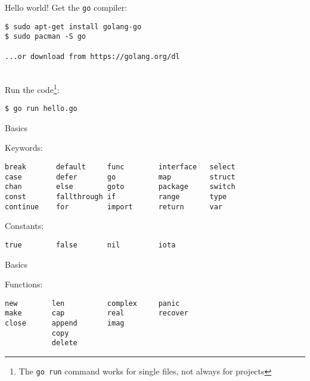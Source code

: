 \documentclass[10pt]{beamer}
\begin{document}
	\begin{frame}[t,fragile]{Hello world!}
		Get the \texttt{go} compiler:
		\begin{verbatim}
$ sudo apt-get install golang-go
$ sudo pacman -S go

...or download from https://golang.org/dl
		\end{verbatim}
		\\
		Run the code\footnote{The \texttt{go run} command works for single files, not always for projects}:
		\begin{verbatim}
$ go run hello.go
		\end{verbatim}
\end{frame}
	
	
	\begin{frame}[t,fragile]{Basics}
		\begin{center}
			Keywords:
		\end{center}
		\begin{verbatim}
break       default     func        interface   select
case        defer       go          map         struct
chan        else        goto        package     switch
const       fallthrough if          range       type
continue    for         import      return      var
		\end{verbatim}
		\vspace*{-4ex}
		\begin{center}
			Constants:
		\end{center}
		\begin{verbatim}
true        false       nil         iota
		\end{verbatim}
\end{frame}


	\begin{frame}[t,fragile]{Basics}
		\begin{center}
			Functions:
		\end{center}
		\begin{verbatim}
new        len          complex     panic
make       cap          real        recover
close      append       imag
           copy 
           delete
		\end{verbatim}
\end{frame}

\end{document}
